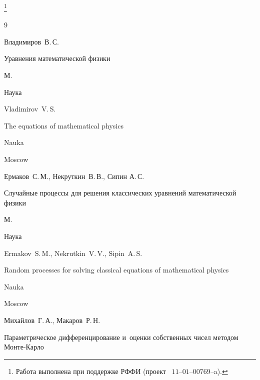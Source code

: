 \thanks{Работа выполнена при поддержке РФФИ (проект \No~$11$--$01$--$00769$--a).}







\begin{thebibliography}{9}




        \by Владимиров~В.\,С.

        \book Уравнения математической физики

        \publaddr М.

        \publ Наука



\misctransl

\by Vladimirov~V.\,S. 

\book The equations of mathematical physics

\publ Nauka

\publaddr Moscow 






        \by Ермаков~С.\,М., Некруткин~В.\,В., Сипин А.\,С.

        \book Случайные процессы для решения классических уравнений математической физики

        \publaddr М.

        \publ Наука



\misctransl

\by Ermakov~S.\,M., Nekrutkin~V.\,V., Sipin~A.\,S. 

\book Random processes for solving classical equations of mathematical physics

\publ Nauka

\publaddr Moscow






        \by Михайлов~Г.\,А., Макаров~Р.\,Н.

        \paper Параметрическое дифференцирование и~оценки собственных чисел методом Монте-Карло


\end{thebibliography}
